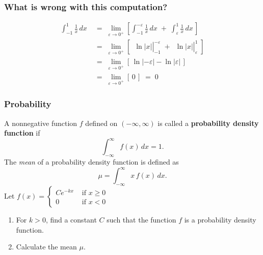 \documentclass[14pt]{beamer}
\begin{document}
	\begin{frame}[t]
		\frametitle{What is wrong with this computation?}

		\[
			\begin{aligned}
				\int_{-1}^{1}\frac{1}{x}\, dx \; & = \; \lim_{\varepsilon \to 0^+}\left[ \int_{-1}^{-\varepsilon}\frac{1}{x}\, dx \; + \; \int_{\varepsilon}^{1}\frac{1}{x}\, dx \, \right]                                                \\
				\;                               & = \; \lim_{\varepsilon \to 0^+}\left[ \left. \phantom{\frac{1}{1}}\ln|x| \right\vert_{-1}^{-\varepsilon}\; + \left. \phantom{\frac{1}{1}}\ln|x| \right\vert_{\varepsilon}^{1}\; \right] \\
				\;                               & = \; \lim_{\varepsilon \to 0^+}\left[ \, \ln|-\varepsilon| - \ln |\varepsilon| \, \right] \phantom{\int}                                                                                \\
				\;                               & = \; \lim_{\varepsilon \to 0^+}\left[ \, 0 \, \right] \; = \; 0 \phantom{\int}
			\end{aligned}
		\]
	\end{frame}

	\begin{frame}[t]
		\fontsize{13}{13}\selectfont
		\frametitle{Probability}

		\fontsize{13}{13}\selectfont
		\vspace{-2mm}

		A nonnegative function $f$ defined on $(-\infty,\infty)$ is called a {\bfseries probability density function }
		if
		\vspace{-2mm}
		\[
			\int_{-\infty}^{\infty}f(x)\, dx=1.
		\]
		The \emph{mean} of a probability density function is defined as
		\vspace{-2mm}
		\[
			\mu=\int_{-\infty}^{\infty}x \, f(x)\, dx.
		\]
		Let $\displaystyle f(x) =
		\begin{cases}
			Ce^{-kx} & \text{ if }x\geq 0 \\
			0        & \text{ if }x <0
		\end{cases}$
		\begin{enumerate}
			\item For $k>0$, find a constant $C$ such that the function $f$ is a
				probability density function.

			\item Calculate the mean $\mu$.
		\end{enumerate}
	\end{frame}
\end{document}
